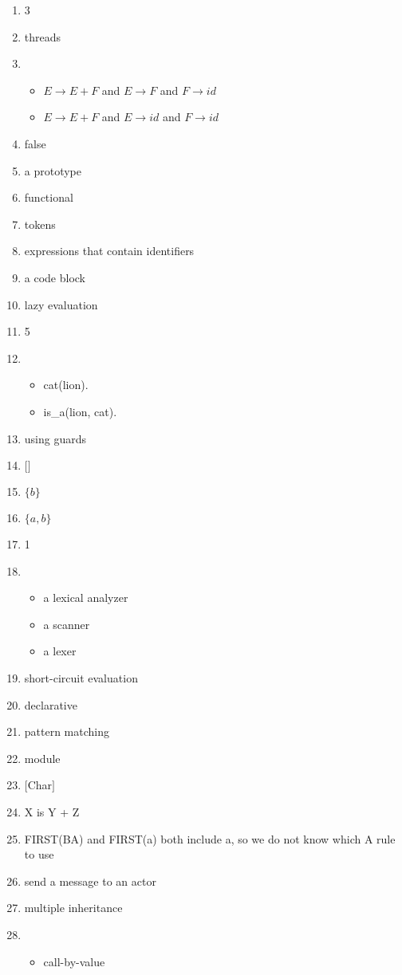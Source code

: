 \documentclass{exam}
\begin{document}
\begin{enumerate}
\item 3
\item threads
\item \begin{itemize}
\item $E \rightarrow E + F$ and $E \rightarrow F$ and $F \rightarrow id$
\item $E \rightarrow E + F$ and $E \rightarrow id$ and $F \rightarrow id$
\end{itemize}
\item false
\item a prototype
\item functional
\item tokens
\item expressions that contain identifiers
\item a code block
\item lazy evaluation
\item 5
\item \begin{itemize}
\item cat(lion).
\item is\_a(lion, cat).
\end{itemize}
\item using guards
\item $\lbrack\rbrack$
\item $\{b\}$
\item $\{a,b\}$
\item 1
\item \begin{itemize}
\item a lexical analyzer
\item a scanner
\item a lexer
\end{itemize}
\item short-circuit evaluation
\item declarative
\item pattern matching
\item module
\item $\lbrack$Char$\rbrack$
\item X is Y + Z
\item FIRST(BA) and FIRST(a) both include a, so we do not know which A rule to use
\item send a message to an actor
\item multiple inheritance
\item \begin{itemize}
\item call-by-value

\end{itemize}
\end{enumerate}
\end{document}
